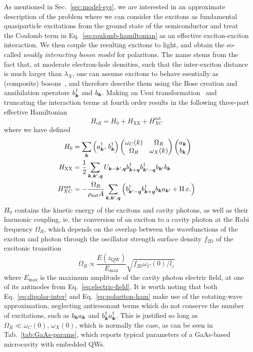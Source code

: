 As mentioned in Sec.~\ref{sec:model-sys}, we are interested in an
approximate description of the problem where we can consider the
excitons as fundamental quasiparticle excitations from the ground
state of the semiconductor and treat the Coulomb term in
Eq.~\eqref{eq:coulomb-hamiltonian} as an effective exciton-exciton
interaction. We then couple the resulting excitons to light, and
obtain the so-called \textit{weakly interacting boson model} for
polaritons. The name stems from the fact that, at moderate
electron-hole densities, such that the inter-exciton distance is much
larger than $\lambda_X$, one can assume excitons to behave esentially
as (composite) bosons~\cite{deveaud2003electron}, and therefore
describe them using the Bose creation and annihilation operators
$b_{\bm{k}}^{\dagger}$ and $b_{\bm{k}}$. Making an Usui
transformation~\cite{PhysRevB.61.13856} and truncating the interaction
terms at fourth order results in the following three-part effective
Hamiltonian~\cite{Ciuti_2003}
%
\begin{equation}\label{eq:total-ham}
  H_{\text{eff}} = H_0  + H_{\text{XX}} + H_{XC}^{\text{sat}}
\end{equation}
% 
where we have defined
\begin{align}
  H_0 & =\sum_{\bm{k}}\left(a_{\bm{k}}^{\dagger},\, b_{\bm{k}}^{\dagger}\right)\begin{pmatrix} \omega_C(k) & \Omega_R\\ \Omega_R & \omega_X(k) \end{pmatrix}\begin{pmatrix} a_{\bm{k}}\\ b_{\bm{k}} \end{pmatrix}\label{eq:polariton-ham}\\
  H_{\text{XX}} & =\frac{1}{2}\sum_{\bm{k},\bm{k}^{\prime},\bm{q}}U_{\bm{k} - \bm{k}^{\prime},\bm{q}}b_{\bm{k} + \bm{q}}^{\dagger}b_{\bm{k}^{\prime} - \bm{q}}^{\dagger}b_{\bm{k}^{\prime}}b_{\bm{k}}\label{eq:interaction-ham}\\
  H_{XC}^{\text{sat}} & =-\frac{\Omega_R}{\rho_{\text{sat}}A}\sum_{\bm{k},\bm{k}^{\prime},\bm{q}}\left(b_{\bm{k}^{\prime}-\bm{q}}^{\dagger}b_{\bm{k} + \bm{q}}^{\dagger}b_{\bm{k}}a_{\bm{k}^{\prime}} + \text{H.c.}\right)\label{eq:saturation-ham}
\end{align}
$H_0$ contains the kinetic energy of the excitons and cavity photons,
as well as their harmonic coupling, ie. the conversion of an exciton
to a cavity photon at the Rabi frequency $\Omega_R$, which depends on
the overlap between the wavefunctions of the exciton and photon
through the  oscillator strength surface density $f_{\text{2D}}$ of
the excitonic transition
%
\begin{equation}\label{eq:omega-R}
  \Omega_R \propto \frac{E(z_{\text{QW}})}{E_{\text{max}}}\sqrt{f_{\text{2D}}\omega_C(0)/l_z}
\end{equation}
% 
where $E_{\text{max}}$ is the maximum amplitude of the cavity photon
electric field, at one of its antinodes from
Eq.~\eqref{eq:electric-field}. It is worth noting that both
Eq.~\eqref{eq:dipolar-inter} and Eq.~\eqref{eq:polariton-ham} make use
of the rotating-wave approximation, neglecting antiresonant terms
which do not conserve the number of excitations, such as
$b_{\bm{k}}a_{\bm{k}}$ and $b_{\bm{k}}^{\dagger}a_{\bm{k}}^{\dagger}$. This is
justified so long as $\Omega_R \ll \omega_C(0),\, \omega_X(0)$, which
is normally the case, as can be seen in Tab.~\ref{tab:GaAs-params},
which reports typical parameters of a GaAs-based microcavity with
embedded QWs.

